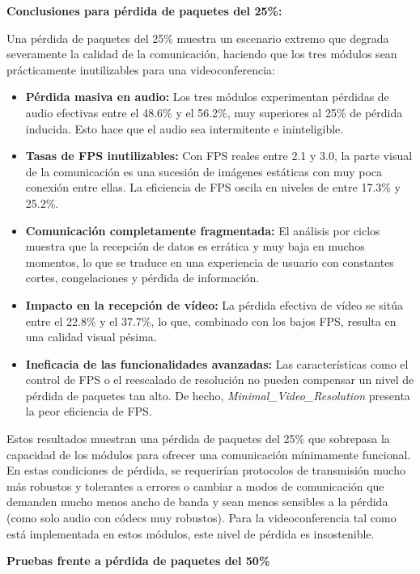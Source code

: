 \textbf{Conclusiones para pérdida de paquetes del 25\%:}

Una pérdida de paquetes del 25\% muestra un escenario extremo que degrada severamente la calidad de la comunicación, haciendo que los tres módulos sean prácticamente inutilizables para una videoconferencia:

\begin{itemize}
\item \textbf{Pérdida masiva en audio:} Los tres módulos experimentan pérdidas de audio efectivas entre el 48.6\% y el 56.2\%, muy superiores al 25\% de pérdida inducida. Esto hace que el audio sea intermitente e ininteligible.
\item \textbf{Tasas de FPS inutilizables:} Con FPS reales entre 2.1 y 3.0, la parte visual de la comunicación es una sucesión de imágenes estáticas con muy poca conexión entre ellas. La eficiencia de FPS oscila en niveles de entre 17.3\% y 25.2\%.
\item \textbf{Comunicación completamente fragmentada:} El análisis por ciclos muestra que la recepción de datos es errática y muy baja en muchos momentos, lo que se traduce en una experiencia de usuario con constantes cortes, congelaciones y pérdida de información.
\item \textbf{Impacto en la recepción de vídeo:} La pérdida efectiva de vídeo se sitúa entre el 22.8\% y el 37.7\%, lo que, combinado con los bajos FPS, resulta en una calidad visual pésima.
\item \textbf{Ineficacia de las funcionalidades avanzadas:} Las características como el control de FPS o el reescalado de resolución no pueden compensar un nivel de pérdida de paquetes tan alto. De hecho, \textit{Minimal\_Video\_Resolution} presenta la peor eficiencia de FPS.
\end{itemize}

Estos resultados muestran una pérdida de paquetes del 25\% que sobrepasa la capacidad de los módulos para ofrecer una comunicación mínimamente funcional. En estas condiciones de pérdida, se requerirían protocolos de transmisión mucho más robustos y tolerantes a errores o cambiar a modos de comunicación que demanden mucho menos ancho de banda y sean menos sensibles a la pérdida (como solo audio con códecs muy robustos). Para la videoconferencia tal como está implementada en estos módulos, este nivel de pérdida es insostenible.
\newpage

\textbf{Pruebas frente a pérdida de paquetes del 50\%}
\vspace{\baselineskip}

